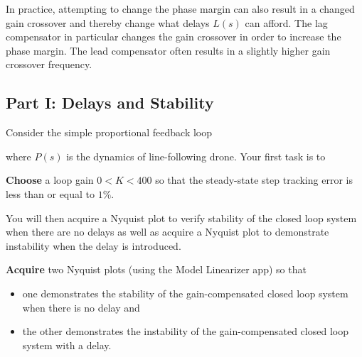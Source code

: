 In practice, attempting to change the phase margin can also result in a changed gain crossover and thereby change what delays \(L(s)\) can afford.
The lag compensator in particular changes the gain crossover in order to increase the phase margin.
The lead compensator often results in a slightly higher gain crossover frequency.

\subsection{Part I: Delays and Stability}
Consider the simple proportional feedback loop
%
\begin{center}
\end{center}
where \(P(s)\) is the dynamics of line-following drone.
Your first task is to
%
\begin{deliverable}[label={del:lab5:p1:1}]
  \textbf{Choose} a loop gain \(0 < K < 400\) so that the steady-state step tracking error is less than or equal to \(1\%.\)
\end{deliverable}
%
You will then acquire a Nyquist plot to verify stability of the closed loop system when there are no delays as well as acquire a Nyquist plot to demonstrate instability when the delay is introduced.
%
\begin{deliverable}[label={del:lab5:p1:2}]
  \textbf{Acquire} two Nyquist plots (using the Model Linearizer app) so that
  \begin{itemize}
    \item{one demonstrates the stability of the gain-compensated closed loop system when there is no delay and}
    \item{the other demonstrates the instability of the gain-compensated closed loop system with a delay.}
  \end{itemize}
\end{deliverable}
